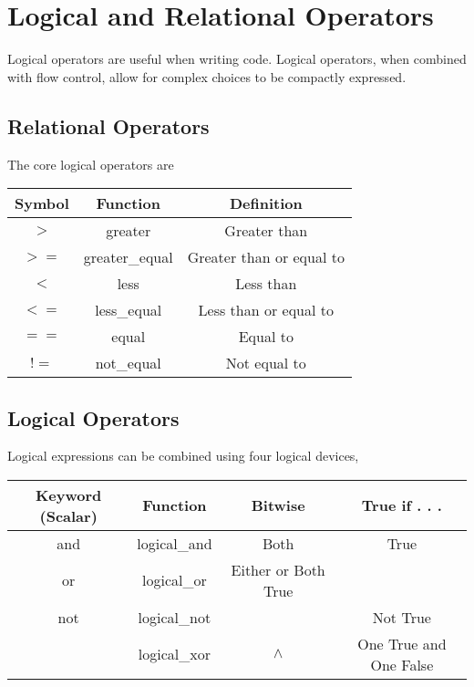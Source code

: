 \documentclass[KSmain.tex]{subfiles}
\begin{document}
 

\section{Logical and Relational Operators}
Logical operators are useful when writing code. Logical operators, when combined
with flow control, allow for complex choices to be compactly expressed.

\subsection{Relational Operators}


The core logical operators are
\begin{center}
\begin{tabular}{|c|c|c|} \hline
Symbol & Function & Definition \\ \hline
$> $     &   greater   & Greater than \\ \hline
$>=$    &  greater\_equal & Greater than or equal to \\ \hline
$< $      &  less & Less than \\ \hline
$<=$    &  less\_equal & Less than or equal to \\ \hline
$==$    &  equal & Equal to \\ \hline
$!=$      & not\_equal & Not equal to \\ \hline
\end{tabular} 
\end{center}

\subsection{Logical Operators}

Logical expressions can be combined using four logical devices,

\begin{tabular}{|c|c|c|c|}
	\hline Keyword (Scalar) & Function & Bitwise & True if . . . \\ \hline
	and & logical\_and & Both & True \\ \hline
	or  & logical\_or & Either or Both True \\ \hline
	not & logical\_not & ~ & Not True \\ \hline
	& logical\_xor & $\wedge$ & One True and One False \\ \hline
\end{tabular} 
\end{document}
